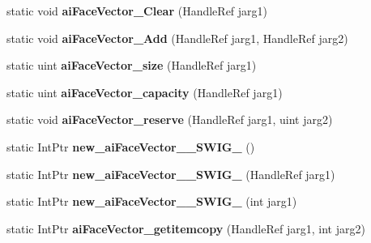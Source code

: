 \begin{DoxyCompactItemize}
\item 
\hypertarget{class_assimp_p_i_n_v_o_k_e_afaa41bbc210c9ffab3d4e9688b70ce2a}{static void {\bfseries ai\+Face\+Vector\+\_\+\+Clear} (Handle\+Ref jarg1)}\label{class_assimp_p_i_n_v_o_k_e_afaa41bbc210c9ffab3d4e9688b70ce2a}

\item 
\hypertarget{class_assimp_p_i_n_v_o_k_e_ad2ffcefe067baec0fc53cc3b1ef85fff}{static void {\bfseries ai\+Face\+Vector\+\_\+\+Add} (Handle\+Ref jarg1, Handle\+Ref jarg2)}\label{class_assimp_p_i_n_v_o_k_e_ad2ffcefe067baec0fc53cc3b1ef85fff}

\item 
\hypertarget{class_assimp_p_i_n_v_o_k_e_a18f969405d057f98f456370d85267683}{static uint {\bfseries ai\+Face\+Vector\+\_\+size} (Handle\+Ref jarg1)}\label{class_assimp_p_i_n_v_o_k_e_a18f969405d057f98f456370d85267683}

\item 
\hypertarget{class_assimp_p_i_n_v_o_k_e_adabb06a097adc632a37d147bc3825030}{static uint {\bfseries ai\+Face\+Vector\+\_\+capacity} (Handle\+Ref jarg1)}\label{class_assimp_p_i_n_v_o_k_e_adabb06a097adc632a37d147bc3825030}

\item 
\hypertarget{class_assimp_p_i_n_v_o_k_e_a82033c3b5e4a6b8d8e588e57cac9a0a2}{static void {\bfseries ai\+Face\+Vector\+\_\+reserve} (Handle\+Ref jarg1, uint jarg2)}\label{class_assimp_p_i_n_v_o_k_e_a82033c3b5e4a6b8d8e588e57cac9a0a2}

\item 
\hypertarget{class_assimp_p_i_n_v_o_k_e_a165b24101ef8cfbaf12b906f6aa86e88}{static Int\+Ptr {\bfseries new\+\_\+ai\+Face\+Vector\+\_\+\+\_\+\+S\+W\+I\+G\+\_} ()}\label{class_assimp_p_i_n_v_o_k_e_a165b24101ef8cfbaf12b906f6aa86e88}

\item 
\hypertarget{class_assimp_p_i_n_v_o_k_e_a4dc0aa4b12fe4449f45bf00f86399ee2}{static Int\+Ptr {\bfseries new\+\_\+ai\+Face\+Vector\+\_\+\+\_\+\+S\+W\+I\+G\+\_} (Handle\+Ref jarg1)}\label{class_assimp_p_i_n_v_o_k_e_a4dc0aa4b12fe4449f45bf00f86399ee2}

\item 
\hypertarget{class_assimp_p_i_n_v_o_k_e_a23eb805783fd57c7fb6985ba0fc083de}{static Int\+Ptr {\bfseries new\+\_\+ai\+Face\+Vector\+\_\+\+\_\+\+S\+W\+I\+G\+\_} (int jarg1)}\label{class_assimp_p_i_n_v_o_k_e_a23eb805783fd57c7fb6985ba0fc083de}

\item 
\hypertarget{class_assimp_p_i_n_v_o_k_e_a05f979215cdd18a4a4ee9b8febec5aef}{static Int\+Ptr {\bfseries ai\+Face\+Vector\+\_\+getitemcopy} (Handle\+Ref jarg1, int jarg2)}\label{class_assimp_p_i_n_v_o_k_e_a05f979215cdd18a4a4ee9b8febec5aef}


\end{DoxyCompactItemize}

